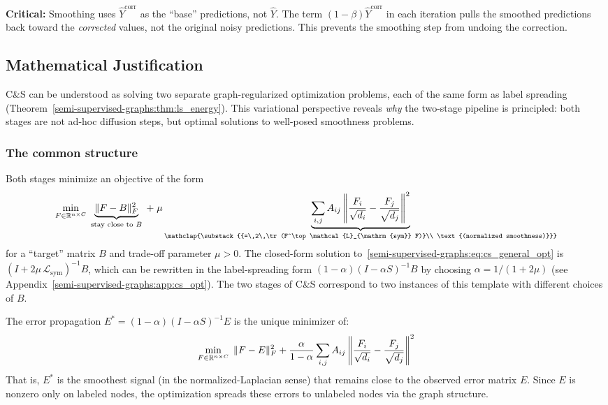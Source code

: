 \begin{notechapter}
\begin{warningbox}
\textbf{Critical:} Smoothing uses $\hat{Y}^{\text{corr}}$ as the ``base''
predictions, not $\hat{Y}$. The term $(1-\beta)\hat{Y}^{\text{corr}}$ in each
iteration pulls the smoothed predictions back toward the \emph{corrected} values,
not the original noisy predictions. This prevents the smoothing step from
undoing the correction.
\end{warningbox}

\subsection{Mathematical Justification}

C\&S can be understood as solving two separate graph-regularized optimization
problems, each of the same form as label spreading
(Theorem~\ref{semi-supervised-graphs:thm:ls_energy}). This variational perspective reveals \emph{why}
the two-stage pipeline is principled: both stages are not ad-hoc diffusion
steps, but optimal solutions to well-posed smoothness problems.

\subsubsection*{The common structure}

Both stages minimize an objective of the form
\begin{equation}
\label{semi-supervised-graphs:eq:cs_general_opt}
\min_{F \in \R^{n \times C}}\;
\underbrace{\|F - B\|_F^2}_{\text{stay close to }B}
\;+\; \mu \underbrace{\sum_{i,j}A_{ij}
\left\|\frac{F_i}{\sqrt{d_i}} - \frac{F_j}{\sqrt{d_j}}\right\|^2}_{
\mathclap{\substack{{=\,2\,\tr(F^\top \mathcal{L}_{\mathrm{sym}} F)}\\
\text{(normalized smoothness)}}}}
\end{equation}
for a ``target'' matrix $B$ and trade-off parameter $\mu > 0$.
The closed-form solution to~\eqref{semi-supervised-graphs:eq:cs_general_opt} is
$(I + 2\mu\,\mathcal{L}_{\mathrm{sym}})^{-1}B$,
which can be rewritten in the label-spreading form
$(1-\alpha)(I - \alpha S)^{-1}B$ by choosing $\alpha = 1/(1+2\mu)$
(see Appendix~\ref{semi-supervised-graphs:app:cs_opt}). The two stages of C\&S correspond to two
instances of this template with different choices of $B$.

\begin{theorem}
\label{semi-supervised-graphs:thm:cs_correct_opt}
The error propagation $E^* = (1-\alpha)(I - \alpha S)^{-1}E$ is the unique
minimizer of:
\begin{equation}
\min_{F \in \mathbb{R}^{n \times C}}\; \|F - E\|_F^2
  + \frac{\alpha}{1-\alpha}\sum_{i,j}A_{ij}
  \left\|\frac{F_i}{\sqrt{d_i}} - \frac{F_j}{\sqrt{d_j}}\right\|^2
\end{equation}
That is, $E^*$ is the smoothest signal (in the normalized-Laplacian sense) that
remains close to the observed error matrix $E$. Since $E$ is nonzero only on
labeled nodes, the optimization spreads these errors to unlabeled nodes via the
graph structure.
\end{theorem}


\end{notechapter}
